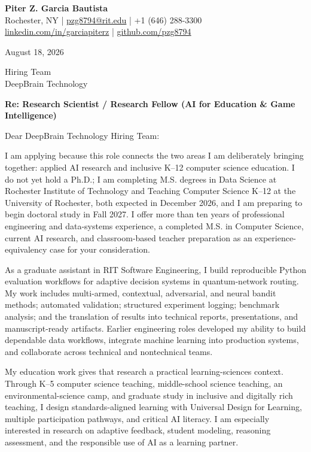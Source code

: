 \documentclass[11pt,letterpaper]{article}
\begin{document}
\textbf{\Large Piter Z. Garcia Bautista}\\
Rochester, NY \enspace|\enspace
\href{mailto:pzg8794@rit.edu}{pzg8794@rit.edu} \enspace|\enspace
+1 (646) 288-3300\\
\href{https://linkedin.com/in/garciapiterz}{linkedin.com/in/garciapiterz}
\enspace|\enspace
\href{https://github.com/pzg8794}{github.com/pzg8794}

\vspace{10pt}
August 18, 2026

Hiring Team\\
DeepBrain Technology

\textbf{Re: Research Scientist / Research Fellow (AI for Education \& Game Intelligence)}

Dear DeepBrain Technology Hiring Team:

I am applying because this role connects the two areas I am deliberately
bringing together: applied AI research and inclusive K--12 computer science
education. I do not yet hold a Ph.D.; I am completing M.S. degrees in Data
Science at Rochester Institute of Technology and Teaching Computer Science
K--12 at the University of Rochester, both expected in December 2026, and I am
preparing to begin doctoral study in Fall 2027. I offer more than ten years of
professional engineering and data-systems experience, a completed M.S. in
Computer Science, current AI research, and classroom-based teacher preparation
as an experience-equivalency case for your consideration.

As a graduate assistant in RIT Software Engineering, I build reproducible
Python evaluation workflows for adaptive decision systems in quantum-network
routing. My work includes multi-armed, contextual, adversarial, and neural
bandit methods; automated validation; structured experiment logging; benchmark
analysis; and the translation of results into technical reports,
presentations, and manuscript-ready artifacts. Earlier engineering roles
developed my ability to build dependable data workflows, integrate machine
learning into production systems, and collaborate across technical and
nontechnical teams.

My education work gives that research a practical learning-sciences context.
Through K--5 computer science teaching, middle-school science teaching, an
environmental-science camp, and graduate study in inclusive and digitally rich
teaching, I design standards-aligned learning with Universal Design for
Learning, multiple participation pathways, and critical AI literacy. I am
especially interested in research on adaptive feedback, student modeling,
reasoning assessment, and the responsible use of AI as a learning partner.
\end{document}
